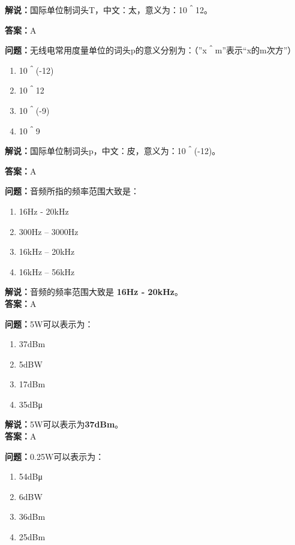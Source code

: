 \textbf{解说：}国际单位制词头T，中文：太，意义为：10＾12。

\textbf{答案：}A

\textbf{问题：}无线电常用度量单位的词头p的意义分别为：（”x＾m”表示“x的m次方”）

\begin{enumerate}[label=\Alph*), leftmargin=1cm]
	\item 10＾(-12)
	\item 10＾12
	\item 10＾(-9)
	\item 10＾9
\end{enumerate}

\textbf{解说：}国际单位制词头p，中文：皮，意义为：10＾(-12)。

\textbf{答案：}A

\textbf{问题：}音频所指的频率范围大致是：

\begin{enumerate}[label=\Alph*), leftmargin=1cm]
	\item 16Hz - 20kHz
	\item 300Hz – 3000Hz
	\item 16kHz – 20kHz
	\item 16kHz – 56kHz
\end{enumerate}

\textbf{解说：}音频的频率范围大致是 \textbf{16Hz - 20kHz}。\\\textbf{答案：}A%



\textbf{问题：}5W可以表示为：

\begin{enumerate}[label=\Alph*), leftmargin=1cm]
	\item 37dBm
	\item 5dBW
	\item 17dBm
	\item 35dBμ
\end{enumerate}

\textbf{解说：}5W可以表示为\textbf{37dBm}。\\\textbf{答案：}A %



\textbf{问题：}0.25W可以表示为：

\begin{enumerate}[label=\Alph*), leftmargin=1cm]
	\item 54dBμ
	\item 6dBW
	\item 36dBm
	\item 25dBm
\end{enumerate}


